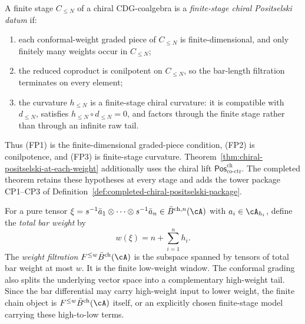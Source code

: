 \begin{definition}
\label{def:finite-stage-chiral-positselski-datum}
A finite stage $C_{\leq N}$ of a chiral CDG-coalgebra is a
\emph{finite-stage chiral Positselski datum} if:
\begin{enumerate}[label=\textup{(FP\arabic*)}]
\item each conformal-weight graded piece of $C_{\leq N}$ is
 finite-dimensional, and only finitely many weights occur in
 $C_{\leq N}$;
\item the reduced coproduct is conilpotent on $C_{\leq N}$, so the
 bar-length filtration terminates on every element;
\item the curvature $h_{\leq N}$ is a finite-stage chiral curvature:
 it is compatible with $d_{\leq N}$, satisfies
 $h_{\leq N}\circ d_{\leq N}=0$, and factors through the finite
 stage rather than through an infinite raw tail.
\end{enumerate}
Thus \textup{(FP1)} is the finite-dimensional graded-piece
condition, \textup{(FP2)} is conilpotence, and
\textup{(FP3)} is finite-stage curvature.
Theorem~\ref{thm:chiral-positselski-at-each-weight} additionally uses
the chiral lift
\(\mathsf{Pos}^{\mathrm{ch}}_{\mathrm{co\text{-}ctr}}\).
The completed theorem retains these hypotheses at every stage and
adds the tower package CP1--CP3 of
Definition~\ref{def:completed-chiral-positselski-package}.
\end{definition}

\begin{definition}
\label{def:total-bar-weight}
For a pure tensor
$\xi = s^{-1}\bar{a}_1 \otimes \cdots \otimes s^{-1}\bar{a}_n
 \in \bar{B}^{\mathrm{ch},n}(\cA)$
with $a_i \in \cA_{h_i}$, define the \emph{total bar weight} by
\begin{equation}\label{eq:total-bar-weight}
w(\xi) = n + \sum_{i=1}^{n} h_i.
\end{equation}
The \emph{weight filtration} $F^{\leq w} \bar{B}^{\mathrm{ch}}(\cA)$
is the subspace spanned by tensors of total bar weight at most $w$.
It is the finite low-weight window.  The conformal grading also splits
the underlying vector space into a complementary high-weight tail.
Since the bar differential may carry high-weight input to lower
weight, the finite chain object is
$F^{\leq w}\bar{B}^{\mathrm{ch}}(\cA)$ itself, or an explicitly chosen
finite-stage model carrying these high-to-low terms.
\end{definition}


